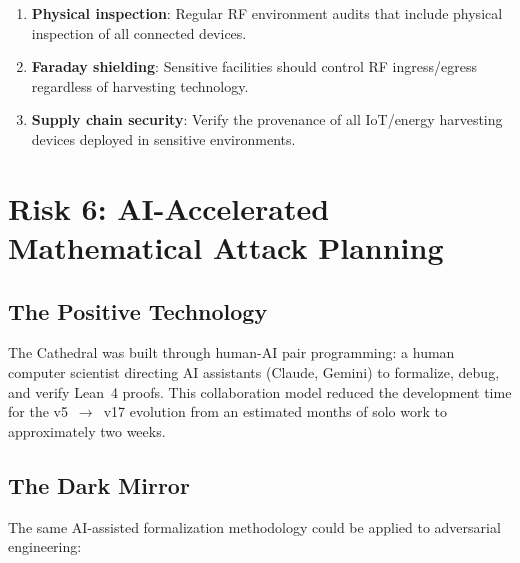 \documentclass[11pt,a4paper]{article}
\begin{document}
\begin{enumerate}
  \item \textbf{Physical inspection}: Regular RF environment audits
    that include physical inspection of all connected devices.
  \item \textbf{Faraday shielding}: Sensitive facilities should
    control RF ingress/egress regardless of harvesting technology.
  \item \textbf{Supply chain security}: Verify the provenance of
    all IoT/energy harvesting devices deployed in sensitive
    environments.
\end{enumerate}

\section{Risk 6: AI-Accelerated Mathematical Attack Planning}
\label{sec:ai}

\subsection{The Positive Technology}

The Cathedral was built through human-AI pair programming: a human
computer scientist directing AI assistants (Claude, Gemini) to formalize,
debug, and verify Lean~4 proofs. This collaboration model reduced the
development time for the v5~$\to$~v17 evolution from an estimated
months of solo work to approximately two weeks.

\subsection{The Dark Mirror}

The same AI-assisted formalization methodology could be applied to
adversarial engineering:
\end{document}

